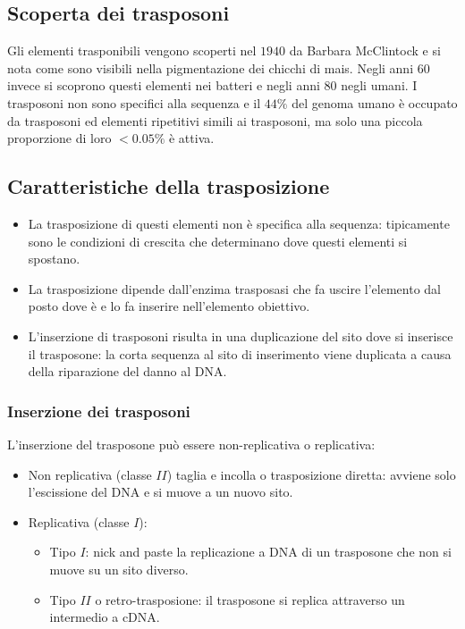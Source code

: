 	\subsection{Scoperta dei trasposoni}
	Gli elementi trasponibili vengono scoperti nel $1940$ da Barbara McClintock e si nota come sono visibili nella pigmentazione dei chicchi di mais.
	Negli anni $60$ invece si scoprono questi elementi nei batteri e negli anni $80$ negli umani.
	I trasposoni non sono specifici alla sequenza e il $44\%$ del genoma umano \`e occupato da trasposoni ed elementi ripetitivi simili ai trasposoni, ma solo una piccola proporzione di loro $< 0.05\%$ \`e attiva.

	\subsection{Caratteristiche della trasposizione}
	\begin{itemize}
		\item La trasposizione di questi elementi non \`e specifica alla sequenza: tipicamente sono le condizioni di crescita che determinano dove questi elementi si spostano.
		\item La trasposizione dipende dall'enzima trasposasi che fa uscire l'elemento dal posto dove \`e e lo fa inserire nell'elemento obiettivo.
		\item L'inserzione di trasposoni risulta in una duplicazione del sito dove si inserisce il trasposone: la corta sequenza al sito di inserimento viene duplicata a causa della riparazione del danno al DNA.
	\end{itemize}

		\subsubsection{Inserzione dei trasposoni}
		L'inserzione del trasposone pu\`o essere non-replicativa o replicativa:
		\begin{itemize}
			\item Non replicativa (classe $II$) taglia e incolla o trasposizione diretta: avviene solo l'escissione del DNA e si muove a un nuovo sito.
			\item Replicativa (classe $I$): 
				\begin{itemize}
					\item Tipo $I$: nick and paste la replicazione a DNA di un trasposone che non si muove su un sito diverso.
					\item Tipo $II$ o retro-trasposione: il trasposone si replica attraverso un intermedio a cDNA.
				\end{itemize}
		\end{itemize}

